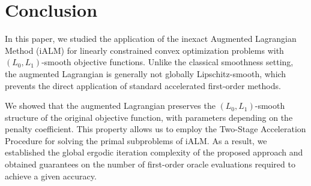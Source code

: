 \documentclass[runningheads]{llncs}
\begin{document}
%		
%	
%	
	
	
%	
	
	\section{Conclusion}
	
	In this paper, we studied the application of the inexact Augmented Lagrangian Method (iALM) for linearly constrained convex optimization problems with $(L_0,L_1)$-smooth objective functions. Unlike the classical smoothness setting, the augmented Lagrangian is generally not globally Lipschitz-smooth, which prevents the direct application of standard accelerated first-order methods.
	
	We showed that the augmented Lagrangian preserves the $(L_0,L_1)$-smooth structure of the original objective function, with parameters depending on the penalty coefficient. This property allows us to employ the Two-Stage Acceleration Procedure for solving the primal subproblems of iALM. As a result, we established the global ergodic iteration complexity of the proposed approach and obtained guarantees on the number of first-order oracle evaluations required to achieve a given accuracy.
	
\end{document}
